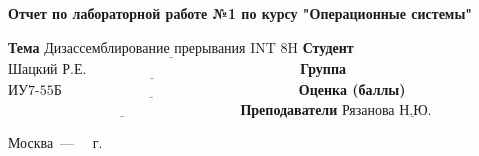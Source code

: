 \begin{titlepage}
    \begin{center}
        \Large\textbf{Отчет по лабораторной работе №1 по курсу "Операционные системы"}\newline
    \end{center}

    \noindent\textbf{Тема} $\underline{\text{Дизассемблирование прерывания INT 8H}}$\newline\newline\newline
    \noindent\textbf{Студент} $\underline{\text{Шацкий Р.Е.~~~~~~~~~~~~~~~~~~~~~~~~~~~~~~~~~~~~~~~~~~~~~}}$\newline\newline
    \noindent\textbf{Группа} $\underline{\text{ИУ7-55Б~~~~~~~~~~~~~~~~~~~~~~~~~~~~~~~~~~~~~~~~~~~~~~~~~~}}$\newline\newline
    \noindent\textbf{Оценка (баллы)} $\underline{\text{~~~~~~~~~~~~~~~~~~~~~~~~~~~~~~~~~~~~~~~~~~~~~~~~~}}$\newline\newline
    \noindent\textbf{Преподаватели} $\underline{\text{Рязанова Н.Ю.~~~~~~~~~~~}}$\newline

    \begin{center}
        \vfill
        Москва~---~\the\year
        ~г.
    \end{center}
    \restoregeometry
\end{titlepage}
